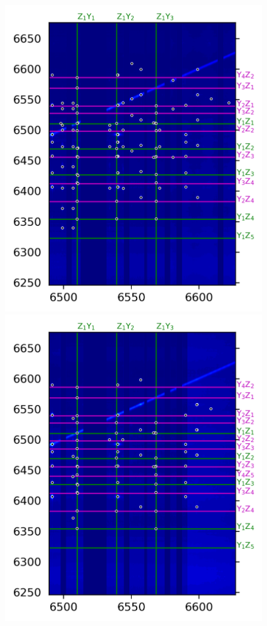 \documentclass[12pt]{report}
\begin{document}
\begin{figure}[b]
{    \includegraphics[scale=0.97]{JinD_site2_60K}\hfill
    \includegraphics[scale=0.97]{JinD_site2_106K}
}
\end{figure}
\end{document}

